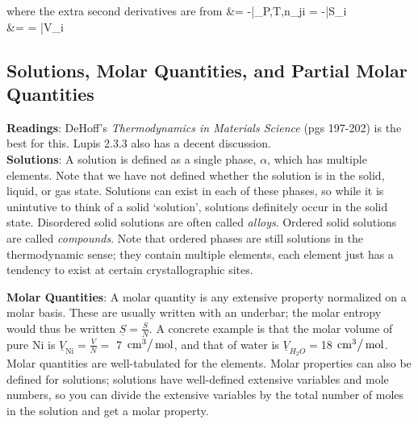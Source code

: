 \documentclass[12pt]{article}
\begin{document}
where the extra second derivatives are from
\eqs
{} &= -|_{P,T,n_{j\neq i}} = -\bar{S_i}\\
 &= = \bar{V_i}
\eqe
\subsection{Solutions, Molar Quantities, and Partial Molar Quantities}
\textbf{Readings}: DeHoff{'}s \textit{ Thermodynamics in Materials Science} (pgs 197-202) is the best for this. Lupis 2.3.3 also has a decent discussion.\\
\textbf{Solutions}: A solution is defined as a single phase, $\alpha$, which has multiple elements. Note that we have not defined whether the solution is in the solid, liquid, or gas state. Solutions can exist in each of these phases, so while it is unintutive to think of a solid `solution', solutions definitely occur in the solid state. Disordered solid solutions are often called \emph{alloys}. Ordered solid solutions are called \emph{compounds}. Note that ordered phases are still solutions in the thermodynamic sense; they contain multiple elements, each element just has a tendency to exist
at certain crystallographic sites.

\textbf{Molar Quantities}: A molar quantity is any extensive property normalized on a molar basis. These are usually written with an underbar; the molar entropy would thus be written $\underline{S}=\frac{S}{N}$. A concrete example is that the molar volume of pure Ni is $\underline{V}_{\text{Ni}}=\frac{V}{N}=$ 7 $\left.\text{cm}^3\right/\text{mol}$, and that of water is $\underline{V}_{H_2O}=$18 $\left.\text{cm}^3\right/\text{mol}$. Molar quantities are well-tabulated for the elements. Molar properties can also be defined for solutions; solutions have well-defined extensive variables and mole numbers, so you can divide the extensive variables by the total number of moles in the solution and get a molar property.\\
\end{document}
